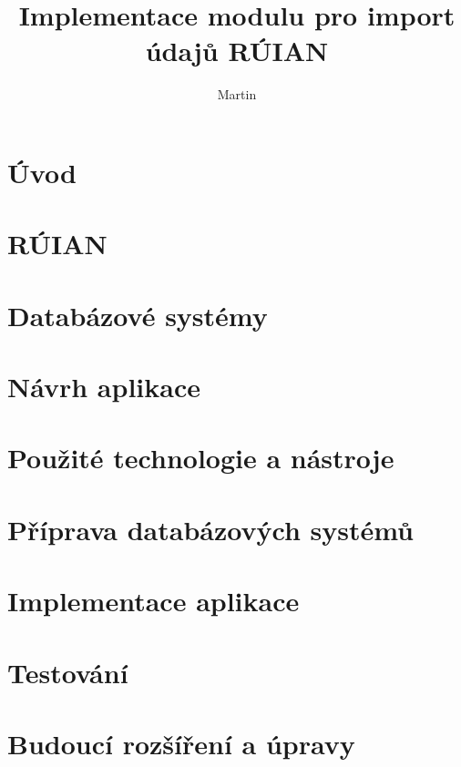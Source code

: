 \documentclass[czech, kiv, ba, he, iso690numb, pdf]{fasthesis}
\title{Implementace modulu pro import údajů RÚIAN}
\author{Martin}{Schön}{}{}
\begin{document}
\frontpages[tm]
\tableofcontents

\chapter{Úvod}


\chapter{RÚIAN}


\chapter{Databázové systémy}


\chapter{Návrh aplikace}


\chapter{Použité technologie a nástroje}


\chapter{Příprava databázových systémů}


\chapter{Implementace aplikace}





\chapter{Testování}


\chapter{Budoucí rozšíření a úpravy}

\end{document}
